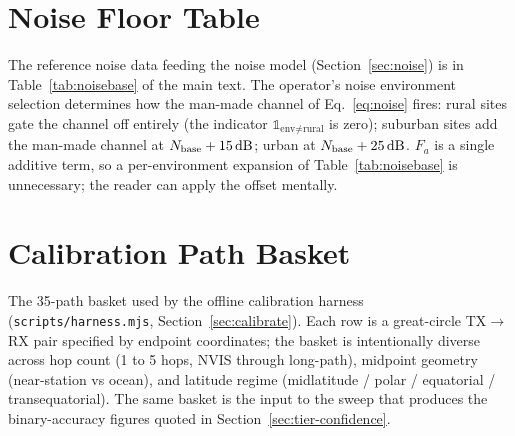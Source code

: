 \documentclass[11pt,a4paper]{article}
\newcommand{\SI}[2]{#1\,\text{#2}}
\newcommand{\dB}{\text{dB}}
\begin{document}
\section{Noise Floor Table}\label{app:noise}

The reference noise data feeding the noise model
(Section~\ref{sec:noise}) is in Table~\ref{tab:noisebase} of the
main text.  The operator's noise environment selection determines
how the man-made channel of Eq.~\ref{eq:noise} fires: rural sites
gate the channel off entirely (the indicator
$\mathbb{1}_{\text{env}\ne\text{rural}}$ is zero); suburban sites
add the man-made channel at $N_{\text{base}} + \SI{15}{\dB}$; urban
at $N_{\text{base}} + \SI{25}{\dB}$.  $F_a$ is a single additive
term, so a per-environment expansion of Table~\ref{tab:noisebase}
is unnecessary; the reader can apply the offset mentally.

\section{Calibration Path Basket}\label{app:paths}

The 35-path basket used by the offline calibration harness
(\texttt{scripts/harness.mjs}, Section~\ref{sec:calibrate}).
Each row is a great-circle TX$\to$RX pair specified by endpoint
coordinates; the basket is intentionally diverse across hop count
(1 to 5 hops, NVIS through long-path), midpoint geometry
(near-station vs ocean), and latitude regime (midlatitude / polar /
equatorial / transequatorial).  The same basket is the input to the
sweep that produces the binary-accuracy figures quoted in
Section~\ref{sec:tier-confidence}.
\end{document}

